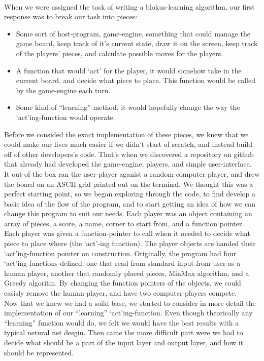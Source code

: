 \documentclass{report}
\begin{document}
	\\
	When we were assigned the task of writing a blokus-learning algorithm, our first response was to break our task into pieces:
	\begin{itemize}
		\item Some sort of host-program, game-engine, something that could manage the game board, keep track of it's current state, draw it on the screen, keep track of the players' pieces,
			and calculate possible moves for the players.
		\item A function that would `act' for the player, it would somehow take in the current board, and decide what piece to place. This function would be called by the game-engine each
			turn.
		\item Some kind of ``learning''-method, it would hopefully change the way the `act'ing-function would operate.
	\end{itemize}
	Before we consided the exact implementation of these pieces, we knew that we could make our lives much easier if we didn't start of scratch, and instead build off of other developers's code.
	That's when we discovered a repository on github that already had developed the game-engine, players, and simple user-interface.\\
	It out-of-the box ran the user-player aganist a random-computer-player, and drew the board on an ASCII grid printed out on the terminal. We thought this was a perfect starting point,
	so we began exploring through the code, to find develop	a basic idea of the flow of the program, and to start getting an idea of how we can change this program to suit our needs.
	Each player was an object containing an array of pieces, a score, a name, corner to start from, and a function pointer. Each player was given a function-pointer to call when it needed
	to decide what piece to place where (the `act'-ing function). The player objects are handed their `act'ing-function pointer on construction. Originally, the program had four `act'ing-functions
	defined: one that read from standard input from user as	a human player, another that randomly placed pieces, MinMax algorithm, and a Greedy algoritm. By changing the function pointers of
	the objects, we could easisly remove the human-player, and have two computer-players compete.\\
	Now that we knew we had a soild base, we started to consider in more detail the implementation of our ``learning'' `act'ing-function. Even though theorically any ``learning'' function would do,
	we felt we would have the best results with a typical netural net desgin. Then came the more difficult part were we had to decide what should be a part of the input layer and output layer,
	and how it should be represented.
	
\end{document}
